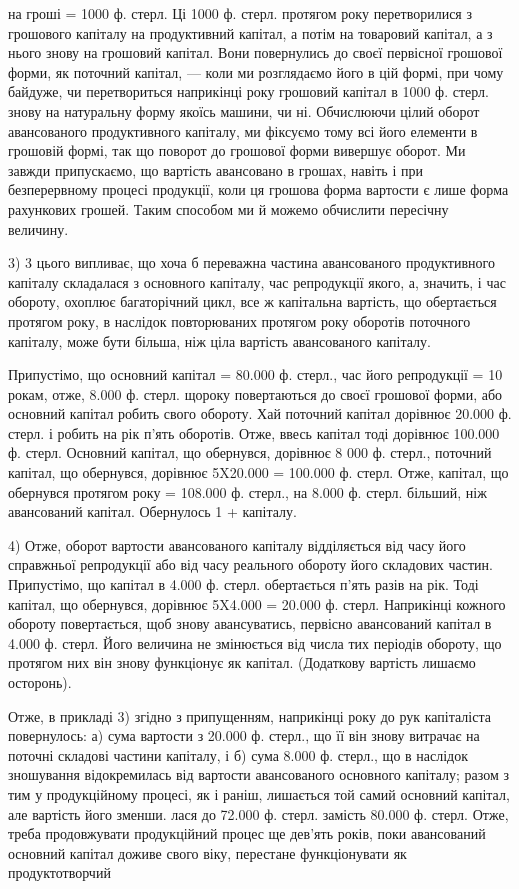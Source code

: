 \parcont{}  %
на гроші  = 1000 ф. стерл. Ці 1000 ф. стерл. протягом року
перетворилися з грошового капіталу на продуктивний капітал, а потім на
товаровий капітал, а з нього знову на грошовий капітал. Вони повернулись
до своєї первісної грошової форми, як поточний капітал, — коли ми
розглядаємо його в цій формі, при чому байдуже, чи перетвориться наприкінці
року грошовий капітал в 1000 ф. стерл. знову на натуральну
форму якоїсь машини, чи ні. Обчислюючи цілий оборот авансованого продуктивного
капіталу, ми фіксуємо тому всі його елементи в грошовій формі,
так що поворот до грошової форми вивершує оборот. Ми завжди припускаємо,
що вартість авансовано в грошах, навіть і при безперервному
процесі продукції, коли ця грошова форма вартости є лише форма
рахункових грошей. Таким способом ми й можемо обчислити пересічну
величину.

3) 3 цього випливає, що хоча б переважна частина авансованого
продуктивного капіталу складалася з основного капіталу, час репродукції
якого, а, значить, і час обороту, охоплює багаторічний цикл, все ж капітальна
вартість, що обертається протягом року, в наслідок повторюваних
протягом року оборотів поточного капіталу, може бути більша, ніж ціла
вартість авансованого капіталу.

Припустімо, що основний капітал = 80.000 ф. стерл., час його репродукції
= 10 рокам, отже, 8.000 ф. стерл. щороку повертаються до своєї
грошової форми, або основний капітал робить  свого обороту. Хай
поточний капітал дорівнює 20.000 ф. стерл. і робить на рік п’ять оборотів.
Отже, ввесь капітал тоді дорівнює 100.000 ф. стерл. Основний
капітал, що обернувся, дорівнює 8 000 ф. стерл., поточний капітал, що
обернувся, дорівнює 5X20.000 = 100.000 ф. стерл. Отже, капітал, що
обернувся протягом року = 108.000 ф. стерл., на 8.000 ф. стерл. більший,
ніж авансований капітал. Обернулось 1 +  капіталу.

4) Отже, оборот вартости авансованого капіталу відділяється
від часу його справжньої репродукції або від часу реального обороту
його складових частин. Припустімо, що капітал в 4.000 ф. стерл. обертається
п’ять разів на рік. Тоді капітал, що обернувся, дорівнює
5X4.000 = 20.000 ф. стерл. Наприкінці кожного обороту повертається,
щоб знову авансуватись, первісно авансований капітал в 4.000 ф. стерл.
Його величина не змінюється від числа тих періодів обороту, що
протягом них він знову функціонує як капітал. (Додаткову вартість
лишаємо осторонь).

Отже, в прикладі 3) згідно з припущенням, наприкінці року до рук
капіталіста повернулось: а) сума вартости з 20.000 ф. стерл., що її він
знову витрачає на поточні складові частини капіталу, і б) сума 8.000 ф.
стерл., що в наслідок зношування відокремилась від вартости авансованого
основного капіталу; разом з тим у продукційному процесі, як і
раніш, лишається той самий основний капітал, але вартість його зменши.
лася до 72.000 ф. стерл. замість 80.000 ф. стерл. Отже, треба продовжувати
продукційний процес ще дев’ять років, поки авансований основний
капітал доживе свого віку, перестане функціонувати як продуктотворчий
\parbreak{}  %
